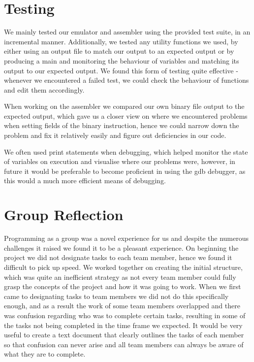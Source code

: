 \documentclass[11pt]{article}
\begin{document}
\section{Testing}

We mainly tested our emulator and assembler using the provided test suite, in an incremental manner. Additionally, we tested any utility functions we used, by either using an output file to match our output to an expected output or by producing a main and monitoring the behaviour of variables and matching its output to our expected output. We found this form of testing quite effective - whenever we encountered a failed test, we could check the behaviour of functions and edit them accordingly. 

When working on the assembler we compared our own binary file output to the expected output, which gave us a closer view on where we encountered problems when setting fields of the binary instruction, hence we could narrow down the problem and fix it relatively easily and figure out deficiencies in our code.

We often used print statements when debugging, which helped monitor the state of variables on execution and visualise where our problems were, however, in future it would be preferable to become proficient in using the gdb debugger, as this would a much more efficient means of debugging.

\section{Group Reflection}

Programming as a group was a novel experience for us and despite the numerous challenges it raised we found it to be a pleasant experience. On beginning the project we did not designate tasks to each team member, hence we found it difficult to pick up speed. We worked together on creating the initial structure, which was quite an inefficient strategy as not every team member could fully grasp the concepts of the project and how it was going to work. 
When we first came to designating tasks to team members we did not do this specifically enough, and as a result the work of some team members overlapped and there was confusion regarding who was to complete certain tasks, resulting in some of the tasks not being completed in the time frame we expected. It would be very useful to create a text document that clearly outlines the tasks of each member so that confusion can never arise and all team members can always be aware of what they are to complete.
\end{document}
